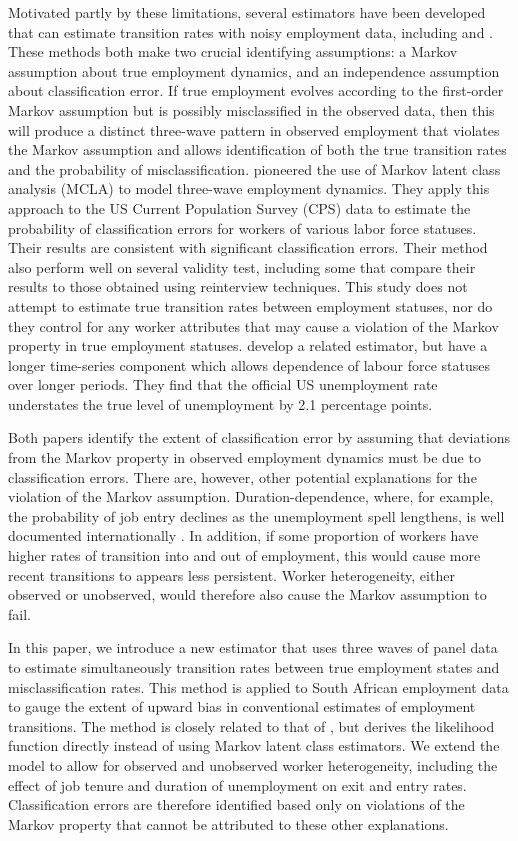 \documentclass[letterpaper,12pt,final,dvipsnames]{article}
\begin{document}
Motivated partly by these limitations, several estimators have been developed that can estimate transition rates with noisy employment data, including \cite{biemer2000} and \cite{feng2013}.  These methods both make two crucial identifying assumptions: a Markov assumption about true employment dynamics, and an independence assumption about classification error. If true employment evolves according to the first-order Markov assumption but is possibly misclassified in the observed data, then this will produce a distinct three-wave pattern in observed employment that violates the Markov assumption and allows identification of both the true transition rates and the probability of misclassification. \cite{biemer2000} pioneered the use of Markov latent class analysis (MCLA) to model three-wave employment dynamics. They apply this approach to the US Current Population Survey (CPS) data to estimate the probability of classification errors for workers of various labor force statuses. Their results are consistent with significant classification errors. Their method also perform well on several validity test, including some that compare their results to those obtained using reinterview techniques. This study does not attempt to estimate true transition rates between employment statuses, nor do they control for any worker attributes that may cause a violation of the Markov property in true employment statuses. \cite{feng2013} develop a related estimator, but have a longer time-series component which allows dependence of labour force statuses over longer periods. They find that the official US unemployment rate understates the true level of unemployment by 2.1 percentage points. 

Both papers identify the extent of classification error by assuming that deviations from the Markov property in observed employment dynamics must be due to classification errors. There are, however, other potential explanations for the violation of the Markov assumption. Duration-dependence, where, for example, the probability of job entry declines as the unemployment spell lengthens, is well documented internationally \citep{Kroft2016, Machin1999, Ljungqvist1998}. In addition, if some proportion of workers have higher rates of transition into and out of employment, this would cause more recent transitions to appears less persistent. Worker heterogeneity, either observed or unobserved, would therefore also cause the Markov assumption to fail. 

In this paper, we introduce a new estimator that uses three waves of panel data to estimate simultaneously transition rates between true employment states and misclassification rates. This method is applied to South African employment data to gauge the extent of upward bias in conventional estimates of employment transitions. The method is closely related to that of \cite{biemer2000}, but derives the likelihood function directly instead of using Markov latent class estimators. We  extend the model to allow for observed and unobserved worker heterogeneity, including the effect of job tenure and duration of unemployment on exit and entry rates. Classification errors are therefore identified based only on violations of the Markov property that cannot be attributed to these other explanations. 
\end{document}
